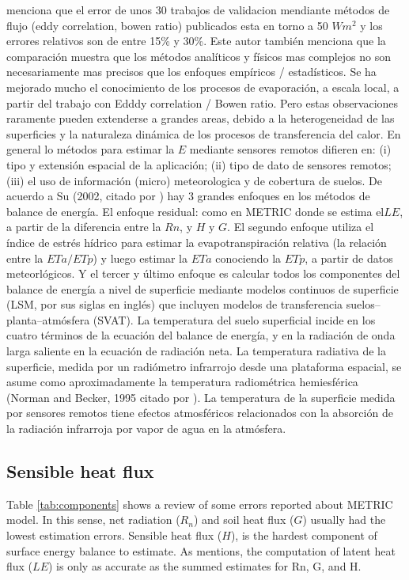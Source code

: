 \documentclass[]{article}
\begin{document}
\citep{Kalma2008} menciona que el error de unos 30 trabajos de validacion mendiante métodos de flujo (eddy correlation, bowen ratio) publicados esta en torno a 50 $W m^2$ y los errores relativos son de entre 15\% y 30\%. Este autor también menciona que la comparación muestra que los métodos analíticos y físicos mas complejos no son necesariamente mas precisos que los enfoques empíricos / estadísticos. 
Se ha mejorado mucho el conocimiento de los procesos de evaporación, a escala local, a partir del trabajo con Edddy correlation / Bowen ratio. Pero estas observaciones raramente pueden extenderse a grandes areas, debido a la heterogeneidad de las superficies y la naturaleza dinámica de los procesos de transferencia del calor. 
En general lo métodos para estimar la $E$ mediante sensores remotos difieren en: (i) tipo y extensión espacial de la aplicación; (ii) tipo de dato de sensores remotos; (iii) el uso de información (micro) meteorologica y de cobertura de suelos.
De acuerdo a Su (2002, citado por \citep{Kalma2008}) hay 3 grandes enfoques en los métodos de balance de energía. El enfoque residual: como en METRIC donde se estima el$LE$, a partir de la diferencia entre la $Rn$, y $H$ y $G$. El segundo enfoque utiliza el índice de estrés hídrico para estimar la evapotranspiración relativa (la relación entre la $ETa/ETp$) y luego estimar la $ETa$ conociendo la $ETp$, a partir de datos meteorlógicos. Y el tercer y último enfoque es calcular todos los componentes del balance de energía a nivel de superficie mediante modelos continuos de superficie (LSM, por sus siglas en inglés) que incluyen modelos de transferencia suelos--planta--atmósfera (SVAT). 
La temperatura del suelo superficial incide en los cuatro términos de la ecuación del balance de energía, y en la radiación de onda larga saliente en la ecuación de radiación neta.
La temperatura radiativa de la superficie, medida por un radiómetro infrarrojo desde una plataforma espacial, se asume como aproximadamente la temperatura radiométrica hemiesférica (Norman and Becker, 1995 citado por \citep{Kalma2008}).
La temperatura de la superficie medida por sensores remotos tiene efectos atmosféricos relacionados con la absorción de la radiación infrarroja por vapor de agua en la atmósfera.

\subsection{Sensible heat flux}

Table \ref{tab:components} shows a review of some errors reported about METRIC model. In this sense, net radiation ($R_n$) and soil heat flux ($G$) usually had the lowest estimation errors. Sensible heat flux ($H$), is the hardest component of surface energy balance to estimate. As \citep{Allen2007a} mentions, the computation of latent heat flux ($LE$) is only as accurate as the summed estimates for Rn, G, and H. 
\end{document}
